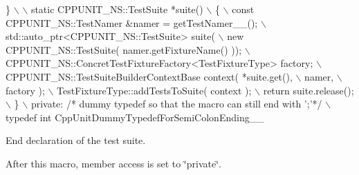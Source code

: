 \begin{DoxyCode}
\}                                                                          \(\backslash\)
                                                                               \(\backslash\)
    static CPPUNIT\_NS::TestSuite *suite()                                      \(\backslash\)
    \{                                                                          \(\backslash\)
      const CPPUNIT\_NS::TestNamer &namer = getTestNamer\_\_();                   \(\backslash\)
      std::auto\_ptr<CPPUNIT\_NS::TestSuite> suite(                              \(\backslash\)
             \textcolor{keyword}{new} CPPUNIT\_NS::TestSuite( namer.getFixtureName() ));             \(\backslash\)
      CPPUNIT\_NS::ConcretTestFixtureFactory<TestFixtureType> factory;          \(\backslash\)
      CPPUNIT\_NS::TestSuiteBuilderContextBase context( *suite.get(),           \(\backslash\)
                                                       namer,                  \(\backslash\)
                                                       factory );              \(\backslash\)
      TestFixtureType::addTestsToSuite( context );                             \(\backslash\)
      return suite.release();                                                  \(\backslash\)
    \}                                                                          \(\backslash\)
  private: \textcolor{comment}{/* dummy typedef so that the macro can still end with ';'*/}         \(\backslash\)
    typedef \textcolor{keywordtype}{int} CppUnitDummyTypedefForSemiColonEnding\_\_
\end{DoxyCode}


End declaration of the test suite. 

After this macro, member access is set to \char`\"{}private\char`\"{}.

